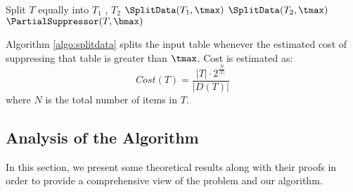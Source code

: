 \begin{algorithm}
\caption{$\SplitData(T,\tmax)$} \label{algo:splitdata}
\begin{algorithmic}[1]
        \STATE Split $T$ equally into $T_1$ , $T_2$
        \STATE $\SplitData(T_1,  \tmax)$
        \STATE $\SplitData(T_2, \tmax)$
    \ELSE
        \STATE $\PartialSuppressor(T,  \bmax)$
    \ENDIF
\end{algorithmic}
\end{algorithm}

Algorithm \ref{algo:splitdata}
splits the input table whenever the estimated cost of
suppressing that table is greater than $\tmax$. 
Cost is estimated as:
\begin{equation}\label{eq:costfunc}
Cost(T)=\frac{|T|\cdot 2^{\frac{N}{|T|}}}{|D(T)|}
\end{equation}
where $N$ is the total number of items in $T$. 

\subsection{Analysis of the Algorithm}
\label{sec:analysis}

%

In this section, we present some theoretical results along with their proofs
in order to provide a comprehensive view of the problem and our algorithm.

